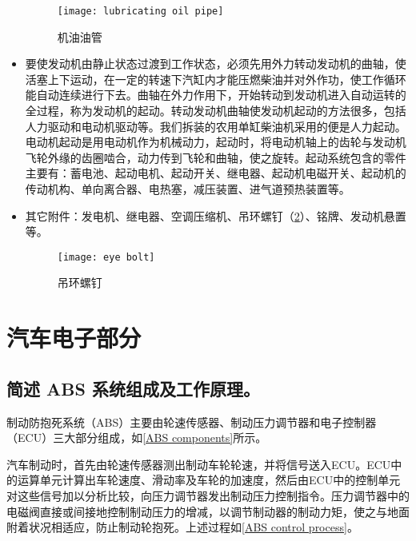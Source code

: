 \documentclass[UTF8]{ctexart}
\numberwithin{figure}{section}
\numberwithin{table}{section}
\begin{document}
\begin{itemize}
	      \begin{figure}[htbp]
		      \centering
		      \begin{minipage}[b]{0.7\textwidth}
			      \centering
			      \texttt{[image: lubricating oil pipe]}
			      \caption{机油油管}
			      \label{lubricating oil pipe}
		      \end{minipage}
	      \end{figure}

	\item 要使发动机由静止状态过渡到工作状态，必须先用外力转动发动机的曲轴，使活塞上下运动，在一定的转速下汽缸内才能压燃柴油并对外作功，使工作循环能自动连续进行下去。曲轴在外力作用下，开始转动到发动机进入自动运转的全过程，称为发动机的起动。转动发动机曲轴使发动机起动的方法很多，包括人力驱动和电动机驱动等。我们拆装的农用单缸柴油机采用的便是人力起动。电动机起动是用电动机作为机械动力，起动时，将电动机轴上的齿轮与发动机飞轮外缘的齿圈啮合，动力传到飞轮和曲轴，使之旋转。起动系统包含的零件主要有：蓄电池、起动电机、起动开关、继电器、起动机电磁开关、起动机的传动机构、单向离合器、电热塞，减压装置、进气道预热装置等。

	\item 其它附件：发电机、继电器、空调压缩机、吊环螺钉（\cref{eye bolt}）、铭牌、发动机悬置等。

	      \begin{figure}[htbp]
		      \centering
		      \begin{minipage}[b]{0.5\textwidth}
			      \centering
			      \texttt{[image: eye bolt]}
			      \caption{吊环螺钉}
			      \label{eye bolt}
		      \end{minipage}
	      \end{figure}
\end{itemize}

\clearpage

\section{汽车电子部分}
\subsection{简述 ABS 系统组成及工作原理。}

制动防抱死系统（ABS）主要由轮速传感器、制动压力调节器和电子控制器（ECU）三大部分组成，如\cref{ABS components}所示。

汽车制动时，首先由轮速传感器测出制动车轮轮速，并将信号送入ECU。ECU中的运算单元计算出车轮速度、滑动率及车轮的加速度，然后由ECU中的控制单元对这些信号加以分析比较，向压力调节器发出制动压力控制指令。压力调节器中的电磁阀直接或间接地控制制动压力的增减，以调节制动器的制动力矩，使之与地面附着状况相适应，防止制动轮抱死。上述过程如\cref{ABS control process}。
\end{document}

